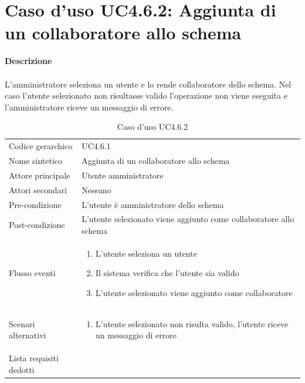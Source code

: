 \documentclass[a4paper]{report}
\begin{document}
	 \section{Caso d'uso UC4.6.2: Aggiunta di un collaboratore allo schema}
	 \textbf{Descrizione} \\ \\
	 L'amministratore seleziona un utente e lo rende collaboratore dello schema. Nel caso l'utente 
	 selezionato non risultasse valido l'operazione non viene eseguita e l'amministratore riceve un 
	 messaggio di errore.
		\begin{table}[H]
		\begin{tabularx}{\textwidth}{X | X}\toprule
			\rowcolor{orange!65}Codice gerarchico & UC4.6.1 \\
			Nome sintetico & Aggiunta di un collaboratore allo schema \\
			\rowcolor{orange!65}Attore principale & Utente amministratore\\
			Attori secondari & Nessuno \\
			\rowcolor{orange!65}Pre-condizione & L'utente è amministratore dello schema \\
			Post-condizione & L'utente selezionato viene aggiunto come collaboratore allo schema \\
			\rowcolor{orange!65}Flusso eventi & \begin{enumerate}
			\item L'utente seleziona un utente
			\item Il sistema verifica che l'utente sia valido
			\item L'utente selezionato viene aggiunto come collaboratore
			\end{enumerate} \\
			Scenari alternativi & \begin{enumerate}
			\item L'utente selezionato non risulta valido, l'utente riceve un messaggio di errore
			\end{enumerate} \\
			\rowcolor{orange!65}Lista requisiti dedotti & \\
			\bottomrule
		\end{tabularx}
		\caption{Caso d'uso UC4.6.2}
	 \end{table}
\end{document}
